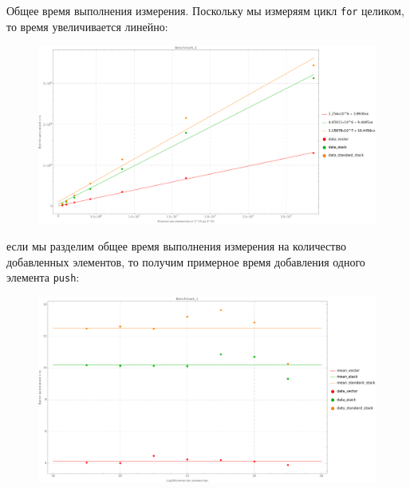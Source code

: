 Общее время выполнения измерения. Поскольку мы измеряям цикл \texttt{for} целиком, то время увеличивается линейно:
\begin{figure}[H]
  \centering
  \includegraphics[width=1.0\textwidth]{../../resources/benchmark_1_1.png}
  \caption{}
\end{figure}
если мы разделим общее время выполнения измерения на количество добавленных элементов, то получим примерное время добавления одного элемента \texttt{push}:
\begin{figure}[H]
  \centering
  \includegraphics[width=1.0\textwidth]{../../resources/benchmark_1_2.png}
  \caption{}
\end{figure}

